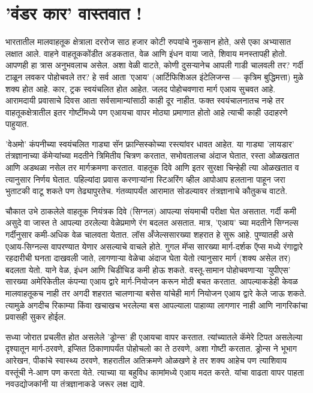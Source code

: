 \chapter{'वंडर कार' वास्तवात !}

भारतातील मालवाहतूक क्षेत्राला दररोज साठ हजार कोटी रुपयांचे नुकसान होते, असे एका अभ्यासात लक्षात आले. वाहने वाहतूककोंडीत अडकतात, वेळ आणि इंधन वाया जाते, शिवाय मनस्तापही होतो. आपणही हा त्रास अनुभवलाच असेल. अशा वेळी वाटते, कोणी दुसऱ्यानेच आपली गाडी चालवली तर? गर्दी टाळून लवकर पोहोचवले तर? हे सर्व आता 'एआय' (आर्टिफिशिअल इंटेलिजन्स — कृत्रिम बुद्धिमत्ता) मुळे शक्य होत आहे. कार, ट्रक स्वयंचलित होत आहेत. जलद पोहोचवणारा मार्ग एआय सुचवत आहे. आरामदायी प्रवासाचे दिवस आता सर्वसामान्यांसाठी काही दूर नाहीत. फक्त स्वयंचालनातच नव्हे तर वाहतूकक्षेत्रातील इतर गोष्टींमध्ये पण एआयचा वापर मोठ्या प्रमाणात होतो आहे त्याची काही उदाहरणे पाहुयात.

'वेअमो' कंपनीच्या स्वयंचलित गाड्या सॅन फ्रान्सिस्कोच्या रस्त्यांवर धावत आहेत. या गाड्या 'लायडार' तंत्रज्ञानाच्या कॅमेर्‍यांच्या मदतीने त्रिमितीय चित्रण करतात, सभोवतालचा अंदाज घेतात, रस्ता ओळखतात आणि अडथळा नसेल तर मार्गक्रमणा करतात. वाहतूक दिवे आणि इतर सुरक्षा चिन्हेही त्या ओळखतात व त्यानुसार निर्णय घेतात. पहिल्यांदा प्रवास करणाऱ्यांना स्टिअरिंग व्हील आपोआप हलताना पाहून जरा भुताटकी वाटू शकते पण तेढ्यापुरतेच. गंतव्यापर्यंत आरामात सोडल्यावर तंत्रज्ञानाचे कौतुकच वाटते.

चौकात उभे ठाकलेले वाहतूक नियंत्रक दिवे (सिग्नल) आपल्या संयमाची परीक्षा घेत असतात. गर्दी कमी असुदे वा जास्त ते आपल्या ठरलेल्या वेळेप्रमाणे रंग बदलत असतात. मात्र, 'एआय' च्या मदतीने सिग्नल्स गर्दीनुसार कमी-अधिक वेळ चालवता येतात. लॉस अँजेल्ससारख्या शहरात हे सुरू आहे. पुण्यातही असे एआय-सिग्नल्स वापरण्यात येणार असल्याचे वाचले होते. गुगल मॅप्स सारख्या मार्ग-दर्शक ऍप्स मध्ये रंगाद्वारे रहदारीची घनता दाखवली जाते, लागणाऱ्या वेळेचा अंदाज घेता येतो त्यानुसार मार्ग (शक्य असेल तर) बदलता येतो. याने वेळ, इंधन आणि चिडीचिड कमी होऊ शकते. वस्तू-सामान पोहोचवणाऱ्या 'युपीएस' सारख्या अमेरिकेतील कंपन्या एआय द्वारे मार्ग-नियोजन करून मोठी बचत करतात. आपल्याकडेही केवळ मालवाहतूकच नाही तर अगदी शहरात चालणाऱ्या बसेस यांचेही मार्ग नियोजन एआय द्वारे केले जाऊ शकते. त्यामुळे अगदीच रिकाम्या किंवा खचाखच भरलेल्या बस आपल्याला पाहाव्या लागणार नाही आणि नागरिकांचा प्रवासही सुकर होईल.

सध्या जोरात प्रचलीत होत असलेले 'ड्रोन्स' ही एआयचा वापर करतात. त्यांच्यातले कॅमेरे टिपत असलेल्या दृश्यातून मार्ग-ठरवणे, इप्सित ठिकाणापर्यंत पोहोचलो का ते ठरवणे, अशा गोष्टी करतात. ड्रोन्स ने भूभाग आरेखन, पीकांचे स्वास्थ्य ठरवणे, शहरातील अतिक्रमणे ओळखणे हे तर शक्य आहेच पण त्याशिवाय वस्तूंची ने-आण पण करता येते. त्याच्या या बहुविध कामांमध्ये एआय मदत करते. यांचा वाढता वापर पाहता नवउद्योजकांनी या तंत्रज्ञानाकडे जरूर लक्ष द्यावे.

